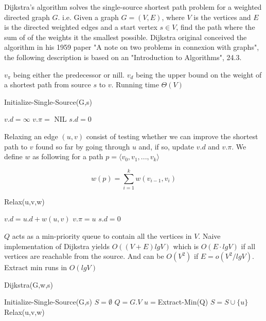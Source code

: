 Dijkstra's algorithm solves the single-source shortest path problem for a
weighted directed graph $G$. i.e. Given a graph $G=(V,E)$, where $V$ is the
vertices and $E$ is the directed weighted edges and a start vertex $s\in V$,
find the path where the sum of of the weights it the smallest possible.
Dijkstra original conceived the algorithm in his 1959 paper "A note on two
problems in connexion with graphs"\cite{dijkstra59}, the following description
is based on an "Introduction to Algorithms"\cite{IntroToAlg}, 24.3.

$v_\pi$ being either the predecessor or nill. $v_d$ being the upper bound on
the weight of a shortest path from source $s$ to $v$. Running time $\Theta (V)$

\begin{algorithm} 
	\caption{Initialize-Single-Source(G,s)}
	\begin{algorithmic}[1] 
			\State $v.d = \infty$
			\State $v.\pi =$ NIL 
		\EndFor 
		\State $s.d = 0$ 
	\end{algorithmic}
\end{algorithm}

Relaxing an edge $(u,v)$ consist of testing whether we can improve the shortest
path to $v$ found so far by going through $u$ and, if so, update $v.d$ and
$v.\pi$. We define $w$ as following for a path $p=\langle v_0,v_1,...,v_k
\rangle$

$$ w(p) = \sum_{i=1}^k w(v_{i-1},v_i) $$

\begin{algorithm} 
	\caption{Relax(u,v,w)} 
	\begin{algorithmic}[1] 
			\State $v.d=u.d+w(u,v)$ 
			\State $v.\pi = u$ 
		\EndIf 
		\State $s.d = 0$
	\end{algorithmic} 
\end{algorithm}

$Q$ acts as a min-priority queue to contain all the vertices in $V$. Naive
implementation of Dijkstra yields $O((V+E)lgV)$ which is $O(E \cdot lgV)$ if
all vertices are reachable from the source. And can be $O(V^2)$ if
$E=o(V^2/lgV)$. Extract min runs in $O(lgV)$ 

\begin{algorithm}[H]
	\caption{Dijkstra(G,w,s)} 
	\begin{algorithmic}[1] 
		\State Initialize-Single-Source(G,s) 
		\State $S = \emptyset$ 
		\State $Q = G.V$ 
			\State $u = $Extract-Min(Q) 
			\State $S = S \cup \{u\}$
				\State Relax(u,v,w) 
			\EndFor 
		\EndWhile
	\end{algorithmic} 
\end{algorithm}

